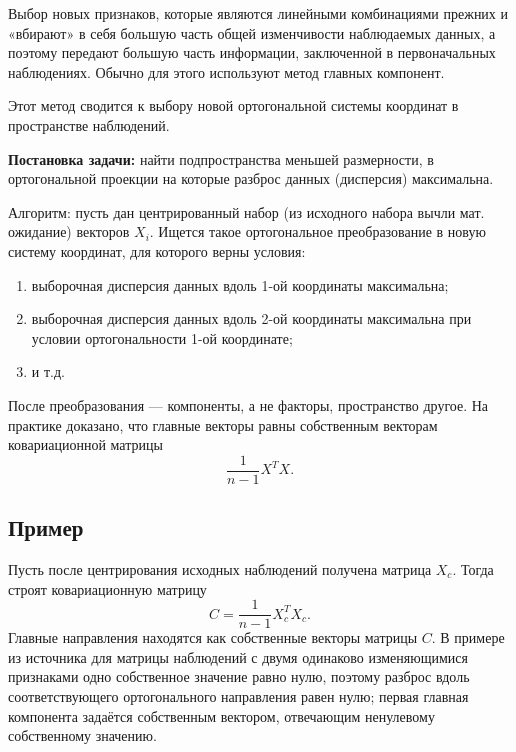 Выбор новых признаков, которые являются линейными комбинациями прежних и «вбирают» в себя большую часть общей изменчивости наблюдаемых данных, а поэтому передают большую часть информации, заключенной в первоначальных наблюдениях. Обычно для этого используют метод главных компонент.

Этот метод сводится к выбору новой ортогональной системы координат в пространстве наблюдений.

\textbf{Постановка задачи:} найти подпространства меньшей размерности, в ортогональной проекции на которые разброс данных (дисперсия) максимальна.

Алгоритм: пусть дан центрированный набор (из исходного набора вычли мат. ожидание) векторов $X_i$. Ищется такое ортогональное преобразование в новую систему координат, для которого верны условия:
\begin{enumerate}
  \item выборочная дисперсия данных вдоль 1-ой координаты максимальна;
  \item выборочная дисперсия данных вдоль 2-ой координаты максимальна при условии ортогональности 1-ой координате;
  \item и т.д.
\end{enumerate}

После преобразования — компоненты, а не факторы, пространство другое. На практике доказано, что главные векторы равны собственным векторам ковариационной матрицы
\[
  \frac{1}{n-1}X^T X.
\]

\subsection*{Пример}

Пусть после центрирования исходных наблюдений получена матрица $X_c$. Тогда строят ковариационную матрицу
\[
  C=\frac{1}{n-1}X_c^TX_c.
\]
Главные направления находятся как собственные векторы матрицы $C$. В примере из источника для матрицы наблюдений с двумя одинаково изменяющимися признаками одно собственное значение равно нулю, поэтому разброс вдоль соответствующего ортогонального направления равен нулю; первая главная компонента задаётся собственным вектором, отвечающим ненулевому собственному значению.

\clearpage
